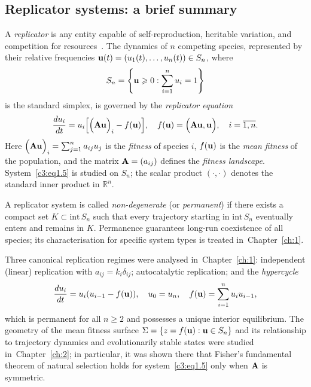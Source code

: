 \documentclass[12pt]{report}
\newcommand{\inside}{\mathrm{int}\,}
\theoremstyle{definition}
\theoremstyle{remark}
\begin{document}
\subsection*{Replicator systems: a brief summary}

A \textit{replicator} is any entity capable of self-reproduction, heritable
variation, and competition for resources~\cite{c3:Eigen1971,c3:Eigen1979}. The
dynamics of $n$ competing species, represented by their relative frequencies
${\bf u}(t) = (u_1(t), \ldots, u_n(t)) \in S_n$, where
$$
	S_n = \left\{ {\bf u} \geqslant 0 : \sum_{i=1}^n u_i = 1 \right\}
$$
is the standard simplex, is governed by the \textit{replicator equation}
\begin{equation}
	\frac{du_i}{dt} = u_i\Big[\Big({\bf Au}\Big)_i - f({\bf u})\Big],
	\quad f({\bf u}) = \Big({\bf Au}, {\bf u}\Big), \quad i = \overline{1,n}.
	\label{c3:eq1.5}
\end{equation}
Here $\Big({\bf Au}\Big)_i = \sum_{j=1}^n a_{ij} u_j$ is the \textit{fitness}
of species $i$, $f({\bf u})$ is the \textit{mean fitness} of the population,
and the matrix ${\bf A} = (a_{ij})$ defines the \textit{fitness landscape}.
System~\eqref{c3:eq1.5} is studied on $S_n$; the scalar product
$(\cdot,\cdot)$ denotes the standard inner product in $\mathbb{R}^n$.

A replicator system is called \textit{non-degenerate} (or \textit{permanent}) if
there exists a compact set $K \subset \inside S_n$ such that every trajectory
starting in $\inside S_n$ eventually enters and remains in $K$. Permanence
guarantees long-run coexistence of all species; its characterisation for specific
system types is treated in~Chapter~\ref{ch:1}.

Three canonical replication regimes were analysed in~Chapter~\ref{ch:1}: independent
(linear) replication with $a_{ij} = k_i \delta_{ij}$; autocatalytic replication;
and the \textit{hypercycle}
\begin{equation}
	\frac{du_i}{dt} = u_i(u_{i-1} - f({\bf u})), \quad u_0 = u_n,
	\quad f({\bf u}) = \sum_{i=1}^n u_i u_{i-1},
	\label{c3:eq1.8}
\end{equation}
which is permanent for all $n \geqslant 2$ and possesses a unique interior
equilibrium. The geometry of the mean fitness surface
$\Sigma = \{ z = f({\bf u}) : {\bf u} \in S_n \}$ and its relationship to
trajectory dynamics and evolutionarily stable states were studied
in~Chapter~\ref{ch:2}; in particular, it was shown there that Fisher's
fundamental theorem of natural selection holds for system~\eqref{c3:eq1.5}
only when ${\bf A}$ is symmetric.
\end{document}
